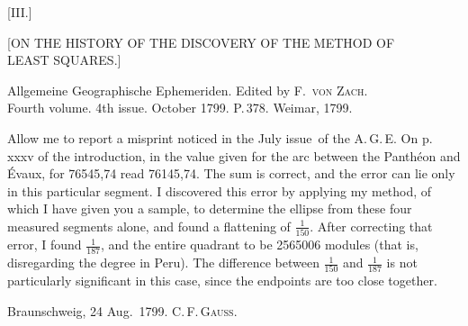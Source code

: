 \clearpage
{}
\begin{center}
[III.]

{[ON THE HISTORY OF THE DISCOVERY OF THE METHOD OF\\
LEAST SQUARES.]}
\end{center}

\begin{center}
Allgemeine Geographische Ephemeriden. Edited by F.\ \textsc{von Zach}.\\
Fourth volume. 4th issue. October 1799. P.\,378. Weimar, 1799.
\end{center}

Allow me to report a misprint noticed in the July issue\ of the A.\,G.\,E. On p.\,xxxv of the introduction, in the value given for the arc between the Panthéon and Évaux, for 76545,74 read 76145,74. The sum is correct, and the error can lie only in this particular segment. I discovered this error by applying my method, of which I have given you a sample, to determine the ellipse from these four measured segments alone, and found a flattening of $\frac{1}{150}$. After correcting that error, I found $\frac{1}{187}$, and the entire quadrant to be 2565006 modules (that is, disregarding the degree in Peru). The difference between $\frac{1}{150}$ and $\frac{1}{187}$ is not particularly significant in this case, since the endpoints are too close together.

\bigskip
\noindent Braunschweig, 24 Aug.\ 1799. \hfill C.\,F.\,\textsc{Gauss}.

